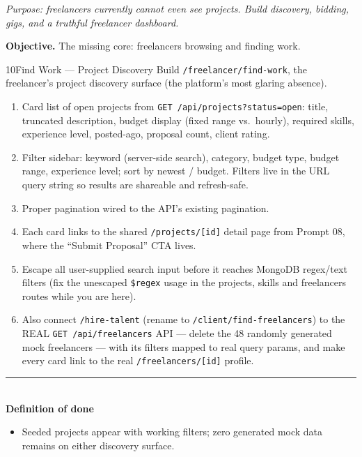 \documentclass[11pt,a4paper]{article}
\newcommand{\dod}{\medskip\noindent\textcolor{donegreen}{\rule{\linewidth}{0.5pt}}\\[1mm]\textbf{\textcolor{donegreen}{Definition of done}}\\[-2mm]}
\newcommand{\objective}[1]{\noindent\textbf{Objective.} #1\medskip}
\begin{document}
\textit{Purpose: freelancers currently cannot even see projects. Build discovery,
bidding, gigs, and a truthful freelancer dashboard.}

\objective{The missing core: freelancers browsing and finding work.}

\begin{promptbox}{10}{Find Work --- Project Discovery}
Build \texttt{/freelancer/find-work}, the freelancer's project discovery surface
(the platform's most glaring absence).

\begin{enumerate}[leftmargin=1.6em]
  \item Card list of open projects from \texttt{GET /api/projects?status=open}:
        title, truncated description, budget display (fixed range vs.\ hourly),
        required skills, experience level, posted-ago, proposal count, client rating.
  \item Filter sidebar: keyword (server-side search), category, budget type, budget
        range, experience level; sort by newest / budget. Filters live in the URL
        query string so results are shareable and refresh-safe.
  \item Proper pagination wired to the API's existing pagination.
  \item Each card links to the shared \texttt{/projects/[id]} detail page from
        Prompt 08, where the ``Submit Proposal'' CTA lives.
  \item Escape all user-supplied search input before it reaches MongoDB regex/text
        filters (fix the unescaped \texttt{\$regex} usage in the projects, skills and
        freelancers routes while you are here).
  \item Also connect \texttt{/hire-talent} (rename to \texttt{/client/find-freelancers})
        to the REAL \texttt{GET /api/freelancers} API --- delete the 48 randomly
        generated mock freelancers --- with its filters mapped to real query params,
        and make every card link to the real \texttt{/freelancers/[id]} profile.
\end{enumerate}

\dod
\begin{itemize}[leftmargin=1.6em]
  \item Seeded projects appear with working filters; zero generated mock data
        remains on either discovery surface.
\end{itemize}
\end{promptbox}
\end{document}

